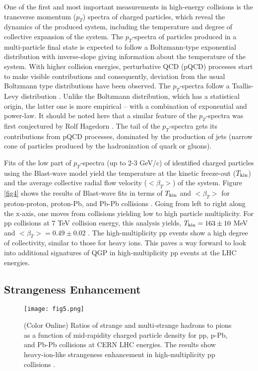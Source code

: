\documentclass[showpacs,showkeys,aps,twocolumn]{revtex4}
\newcommand\+{\dagger}
\begin{document}
One of the first and most important measurements in high-energy collisions is the transverse momentum ($p_T$) spectra of charged particles, which reveal the dynamics of the produced system, including the temperature and degree of collective expansion of the system. The $p_T$-spectra of particles produced in a multi-particle final state is expected to follow a Boltzmann-type exponential distribution with inverse-slope giving information about the temperature of the system. With higher collision energies, perturbative QCD (pQCD) processes start to make visible contributions and consequently, deviation from the usual Boltzmann type distributions have been observed. The $p_T$-spectra follow a Tsallis-Levy distribution \cite{Ref10,Ref11,Ref12,Ref13,Ref14}. Unlike the Boltzmann distribution, which has a statistical origin, the latter one is more empirical – with a combination of exponential and power-law. It should be noted here that a similar feature of the $p_T$-spectra was first conjectured by Rolf Hagedorn \cite{Ref15}. The tail of the $p_T$-spectra gets its contributions from pQCD processes, dominated by the production of jets (narrow cone of particles produced by the hadronization of quark or gluons). 

Fits of the low part of $p_T$-spectra (up to 2-3 GeV/c) of identified charged particles using the Blast-wave model yield the temperature at the kinetic freeze-out ($T_{\rm kin}$) and the average collective radial flow velocity ($<\beta_T>$) of the system. Figure \ref{fig4} shows the results of Blast-wave fits in terms of $T_{\rm kin}$ and $<\beta_T>$ for proton-proton, proton-Pb, and Pb-Pb collisions \cite{Ref16,Ref17}. Going from left to right along the x-axis, one moves from collisions yielding low to high particle multiplicity. For pp collisions at 7 TeV collision energy, this analysis yields, $T_{\rm kin} = 163\pm10$ MeV and $<\beta_T> = 0.49 \pm 0.02$ \cite{Ref17}. The high-multiplicity pp events show a high degree of collectivity, similar to those for heavy ions. This paves a way forward to look into additional signatures of QGP in high-multiplicity pp events at the LHC energies.

\subsection{Strangeness Enhancement}
\begin{figure}[ht]
\texttt{[image: fig5.png]}
\caption[]{(Color Online) Ratios of strange and multi-strange hadrons to pions as a function of mid-rapidity charged particle density for pp, p-Pb, and Pb-Pb collisions at CERN LHC energies. The results show heavy-ion-like strangeness enhancement in high-multiplicity pp collisions \cite{Ref16,Ref17}.}
\label{fig5}
\end{figure}
\end{document}
